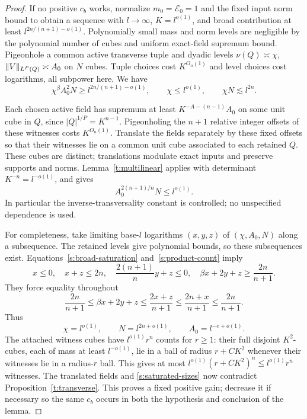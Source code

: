 \begin{proof}
If no positive $c_b$ works, normalize $m_0=\mathcal E_0=1$ and the
fixed input norm bound to obtain a sequence with $l\to\infty$,
$K=l^{o(1)}$, and broad contribution at least
$l^{2n/(n+1)-o(1)}$.  Polynomially small mass and norm levels are
negligible by the polynomial number of cubes and uniform exact-field
supremum bound.  Pigeonhole a common active transverse tuple and dyadic
levels $\nu(Q)\asymp\chi$, $\lVert V\rVert_{L^P(Q)}\asymp A_0$ on $N$
cubes.  Tuple choices cost $K^{O_n(1)}$ and level choices cost logarithms,
all subpower here.  We have
\begin{equation}\label{s:broad-saturation}
 \chi^\beta A_0^2N\ge l^{2n/(n+1)-o(1)},\qquad
 \chi\le l^{o(1)},\qquad \chi N\lesssim l^{2n}.
\end{equation}

Each chosen active field has supremum at least
$K^{-A-(n-1)}A_0$ on some unit cube in $Q$, since
$|Q|^{1/P}=K^{n-1}$.  Pigeonholing the $n+1$ relative integer offsets
of these witnesses costs $K^{O_n(1)}$.  Translate the fields separately
by these fixed offsets so that their witnesses lie on a common unit
cube associated to each retained $Q$.  These cubes are distinct;
translations modulate exact inputs and preserve supports and norms.
Lemma~\ref{t:multilinear} applies with determinant
$K^{-n}=l^{-o(1)}$, and gives
\begin{equation}\label{s:product-count}
 A_0^{2(n+1)/n}N\le l^{o(1)}.
\end{equation}
In particular the inverse-transversality constant is controlled; no
unspecified dependence is used.

For completeness, take limiting base-$l$ logarithms $(x,y,z)$ of
$(\chi,A_0,N)$ along a subsequence.  The retained levels give polynomial
bounds, so these subsequences exist.  Equations~\eqref{s:broad-saturation}
and~\eqref{s:product-count} imply
\[
 x\le0,\quad x+z\le2n,\quad \frac{2(n+1)}n y+z\le0,\quad
 \beta x+2y+z\ge\frac{2n}{n+1}.
\]
They force equality throughout
\[
 \frac{2n}{n+1}\le\beta x+2y+z
 \le\frac{2x+z}{n+1}
 \le\frac{2n+x}{n+1}\le\frac{2n}{n+1}.
\]
Thus
\begin{equation}\label{s:saturated-sizes}
 \chi=l^{o(1)},\qquad N=l^{2n+o(1)},\qquad
 A_0=l^{-e+o(1)}.
\end{equation}
The attached witness cubes have $l^{o(1)}r^n$ counts for $r\ge1$:
their full disjoint $K^2$-cubes, each of mass at least $l^{-o(1)}$,
lie in a ball of radius $r+CK^2$ whenever their witnesses lie in a
radius-$r$ ball.  This gives at most
$l^{o(1)}(r+CK^2)^n\le l^{o(1)}r^n$ witnesses.
The translated fields and \eqref{s:saturated-sizes} now contradict
Proposition~\ref{t:transverse}.  This proves a fixed positive gain;
decrease it if necessary so the same $c_b$ occurs in both the hypothesis
and conclusion of the lemma.
\end{proof}

